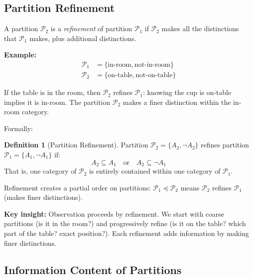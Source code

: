 \documentclass[twocolumn,10pt]{article}
\theoremstyle{definition}
\newtheorem{definition}[theorem]{Definition}
\theoremstyle{remark}
\begin{document}
\subsection{Partition Refinement}

A partition $\mathcal{P}_2$ is a \textit{refinement} of partition $\mathcal{P}_1$ if $\mathcal{P}_2$ makes all the distinctions that $\mathcal{P}_1$ makes, plus additional distinctions.

\vspace{0.2cm}
\noindent\textbf{Example:}
\begin{align}
\mathcal{P}_1 &= \{\text{in-room}, \text{not-in-room}\} \\
\mathcal{P}_2 &= \{\text{on-table}, \text{not-on-table}\}
\end{align}

If the table is in the room, then $\mathcal{P}_2$ refines $\mathcal{P}_1$: knowing the cup is on-table implies it is in-room. The partition $\mathcal{P}_2$ makes a finer distinction within the in-room category.

\vspace{0.2cm}
\noindent Formally:

\begin{definition}[Partition Refinement]
Partition $\mathcal{P}_2 = \{A_2, \neg A_2\}$ refines partition $\mathcal{P}_1 = \{A_1, \neg A_1\}$ if:
\begin{equation}
A_2 \subseteq A_1 \quad \text{or} \quad A_2 \subseteq \neg A_1
\end{equation}
That is, one category of $\mathcal{P}_2$ is entirely contained within one category of $\mathcal{P}_1$.
\end{definition}

\noindent Refinement creates a partial order on partitions: $\mathcal{P}_1 \preceq \mathcal{P}_2$ means $\mathcal{P}_2$ refines $\mathcal{P}_1$ (makes finer distinctions).

\vspace{0.2cm}
\noindent\textbf{Key insight:} Observation proceeds by refinement. We start with coarse partitions (is it in the room?) and progressively refine (is it on the table? which part of the table? exact position?). Each refinement adds information by making finer distinctions.

\subsection{Information Content of Partitions}
\end{document}
